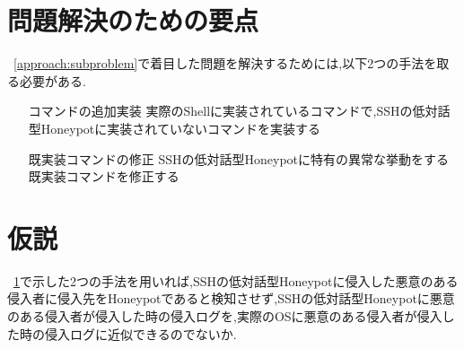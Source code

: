 \section{問題解決のための要点}
\label{approach:YotenForProblem}
~\ref{approach:subproblem}で着目した問題を解決するためには,以下2つの手法を取る必要がある.

\begin{itemize}
\setlength{\leftskip}{3.2cm}
 \item[コマンドの追加実装] 実際のShellに実装されているコマンドで,SSHの低対話型Honeypotに実装されていないコマンドを実装する
 \item[既実装コマンドの修正] SSHの低対話型Honeypotに特有の異常な挙動をする既実装コマンドを修正する
\end{itemize}


\section{仮説}
\label{approach:Hypothesis}
~\ref{approach:YotenForProblem}で示した2つの手法を用いれば,SSHの低対話型Honeypotに侵入した悪意のある侵入者に侵入先をHoneypotであると検知させず,SSHの低対話型Honeypotに悪意のある侵入者が侵入した時の侵入ログを,実際のOSに悪意のある侵入者が侵入した時の侵入ログに近似できるのでないか.

